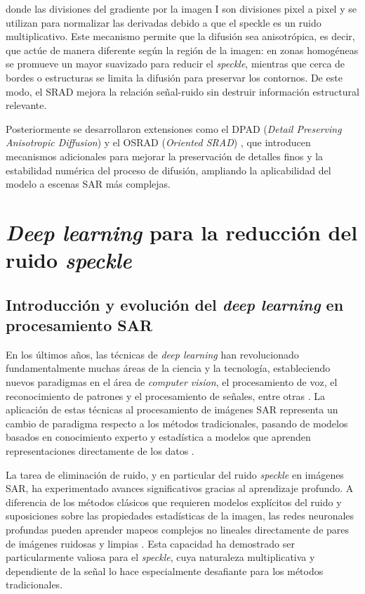 \vspace{0.3cm}

\noindent donde las divisiones del gradiente por la imagen $\text{I}$ son divisiones pixel a pixel y se utilizan para normalizar las derivadas debido a que el speckle es un ruido multiplicativo. Este mecanismo permite que la difusión sea anisotrópica, es decir, que actúe de manera diferente según la región de la imagen: en zonas homogéneas se promueve un mayor suavizado para reducir el \emph{speckle}, mientras que cerca de bordes o estructuras se limita la difusión para preservar los contornos. De este modo, el SRAD mejora la relación señal-ruido sin destruir información estructural relevante.

Posteriormente se desarrollaron extensiones como el DPAD (\emph{Detail Preserving Anisotropic Diffusion}) \cite{aja2006enhanced} y el OSRAD (\emph{Oriented SRAD}) \cite{krissian2007noise}, que introducen mecanismos adicionales para mejorar la preservación de detalles finos y la estabilidad numérica del proceso de difusión, ampliando la aplicabilidad del modelo a escenas SAR más complejas.

\section{\emph{Deep learning} para la reducción del ruido \emph{speckle}}

\subsection{Introducción y evolución del \emph{deep learning} en procesamiento SAR}

En los últimos años, las técnicas de \emph{deep learning} han revolucionado fundamentalmente muchas áreas de la ciencia y la tecnología, estableciendo nuevos paradigmas en el área de \emph{computer vision}, el procesamiento de voz, el reconocimiento de patrones y el procesamiento de señales, entre otras \cite{lecun2015deep}. La aplicación de estas técnicas al procesamiento de imágenes SAR representa un cambio de paradigma respecto a los métodos tradicionales, pasando de modelos basados en conocimiento experto y estadística a modelos que aprenden representaciones directamente de los datos \cite{zhu2021deep}.

La tarea de eliminación de ruido, y en particular del ruido \emph{speckle} en imágenes SAR, ha experimentado avances significativos gracias al aprendizaje profundo. A diferencia de los métodos clásicos que requieren modelos explícitos del ruido y suposiciones sobre las propiedades estadísticas de la imagen, las redes neuronales profundas pueden aprender mapeos complejos no lineales directamente de pares de imágenes ruidosas y limpias \cite{zhang2017beyond}. Esta capacidad ha demostrado ser particularmente valiosa para el \emph{speckle}, cuya naturaleza multiplicativa y dependiente de la señal lo hace especialmente desafiante para los métodos tradicionales.

